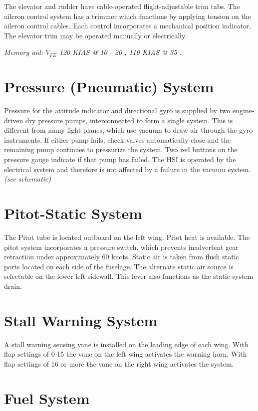 The elevator and rudder have cable-operated flight-adjustable trim tabs. The aileron control system has a trimmer
which functions by applying tension on the aileron control cables. Each control incorporates a mechanical position
indicator. The elevator trim may be operated manually or electrically.

\emph{Memory aid: $V_{FE}$ 120 KIAS @ 10 \degree{} - 20 \degree{}, 110 KIAS @ 35 \degree.}

\section{Pressure (Pneumatic) System}

Pressure for the attitude indicator and directional gyro is supplied by two engine-driven dry pressure pumps,
interconnected to form a single system. This is different from many light planes, which use vacuum to draw air
through the gyro instruments. If either pump fails, check valves automatically close and the remaining pump
continues to pressurize the system. Two red buttons on the pressure gauge indicate if that pump has failed. The HSI
is operated by the electrical system and therefore is not affected by a failure in the vacuum system.
\emph{(see schematic)}

\section{Pitot-Static System}

The Pitot tube is located outboard on the left wing. Pitot heat is available. The pitot system incorporates a pressure
switch, which prevents inadvertent gear retraction under approximately 60 knots. Static air is taken from flush static
ports located on each side of the fuselage. The alternate static air source is selectable on the lower left sidewall.
This lever also functions as the static system drain.

\section{Stall Warning System}

A stall warning sensing vane is installed on the leading edge of each wing. With flap settings of 0-15\degree{} the vane on
the left wing activates the warning horn. With flap settings of 16\degree{} or more the vane on the right wing activates the
system.

\section{Fuel System}

